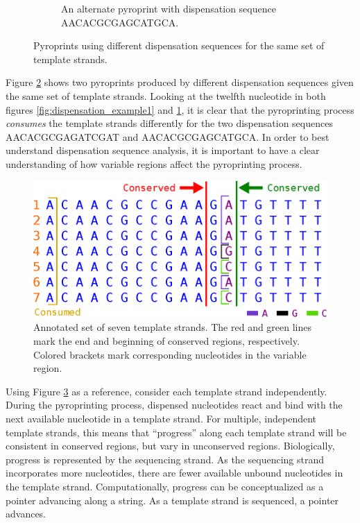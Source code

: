 \documentclass[12pt]{ucthesis}
\begin{document}
\begin{figure}[t]
\begin{subfigure}[t]{0.45\textwidth}
            \caption{An alternate pyroprint with dispensation sequence
                     AACACGCGAGCATGCA.}
            \label{fig:dispensation_example2}
         \end{subfigure}
         \caption{Pyroprints using different dispensation sequences for the same
                  set of template strands.}
         \label{fig:dispensation_examples}
      \end{figure}

      Figure \ref{fig:dispensation_examples} shows two pyroprints produced by
      different dispensation sequences given the same set of template strands.
      Looking at the twelfth nucleotide in both figures
      \ref{fig:dispensation_example1} and \ref{fig:dispensation_example2}, it
      is clear that the pyroprinting process \textit{consumes} the template
      strands differently for the two dispensation sequences
      \textnormal{AACACGCGAGATCGAT} and \textnormal{AACACGCGAGCATGCA}. In order
      to best understand dispensation sequence analysis, it is important to
      have a clear understanding of how variable regions affect the
      pyroprinting process.

      \begin{figure}[t]
         \centering
         \includegraphics[width=0.7\columnwidth]{graphics/TemplateStrandAdvancement.eps}
         \caption{Annotated set of seven template strands. The red and green
                  lines mark the end and beginning of conserved regions,
                  respectively. Colored brackets mark corresponding nucleotides
                  in the variable region.}
         \label{fig:annotated_templates}
      \end{figure}

      Using Figure \ref{fig:annotated_templates} as a reference, consider each
      template strand independently. During the pyroprinting process, dispensed
      nucleotides react and bind with the next available nucleotide in a
      template strand. For multiple, independent template strands, this means
      that ``progress'' along each template strand will be consistent in
      conserved regions, but vary in unconserved regions. Biologically,
      progress is represented by the sequencing strand. As the sequencing
      strand incorporates more nucleotides, there are fewer available unbound
      nucleotides in the template strand. Computationally, progress can be
      conceptualized as a pointer advancing along a string. As a template
      strand is sequenced, a pointer advances.
\end{document}
